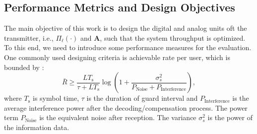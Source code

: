\documentclass[12pt,draftclsnofoot,onecolumn,journal]{IEEEtran}
\newcommand{\brc}[1]{ \left( #1 \right) }
\begin{document}
%
%
% 
% 
%





\subsection{Performance Metrics and Design Objectives}
The main objective of this work is to design the digital and analog units oft the transmitter, i.e., $\Pi_\ell\brc{\cdot}$ and $\mathbf{A}$, such that the system throughput is optimized. To this end, we need to introduce some performance measures for the evaluation. One commonly used designing criteria is achievable rate per user, which is bounded by \cite{sedaghat2017novel}:
\begin{equation}
\bar R\geq \frac{LT_{\mathrm{s}}}{\tau+LT_{\mathrm{s}}}\log\left(1+\frac{\sigma_s^2}{P_{\mathrm{Noise}}+P_{\mathrm{Interference}}}\right),
\end{equation}
where $T_{\mathrm{s}}$ is symbol time, $\tau$ is the duration of guard interval and $P_{\mathrm{Interference}}$ is the average interference power after the decoding/compensation process. The power term $P_{\mathrm{Noise}}$ is the equivalent noise after reception. The variance $\sigma_s^2$ is the power of the information data. 
\end{document}

